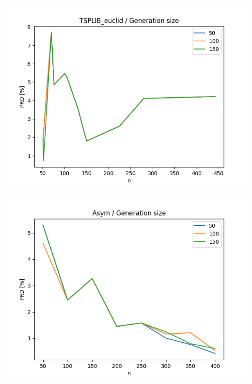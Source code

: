 \documentclass{article}
\begin{document}
\begin{center}
\includegraphics[width=\textwidth, 
                   height = 0.4\textheight, 
                   keepaspectratio]
                  {plots/tsplib_euclid_3_generation_size} 
\end{center}

\begin{center}
\includegraphics[width=\textwidth, 
                   height = 0.4\textheight, 
                   keepaspectratio]
                  {plots/asym_3_generation_size} 
\end{center}
\end{document}
